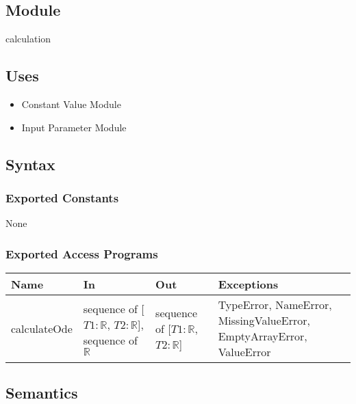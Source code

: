 \documentclass[12pt, titlepage]{article}
\begin{document}
\subsection{Module}

calculation

\subsection{Uses}

\begin{itemize}
    \item Constant Value Module 
    \item Input Parameter Module
\end{itemize}

\subsection{Syntax}

\subsubsection{Exported Constants}
None

\subsubsection{Exported Access Programs}

\begin{tabular}{p{3cm} p{5cm} p{4cm} p{2.5cm}}
\hline
\textbf{Name} & \textbf{In} & \textbf{Out} & \textbf{Exceptions} \\
\hline
calculateOde & sequence of [$T1: \mathbb{R}$, $T2: \mathbb{R}$], sequence of $\mathbb{R}$ & sequence of [$T1: \mathbb{R}$, $T2: \mathbb{R}$] & TypeError, NameError, MissingValueError, EmptyArrayError, ValueError \\
\hline
\end{tabular}

\subsection{Semantics}
\end{document}

